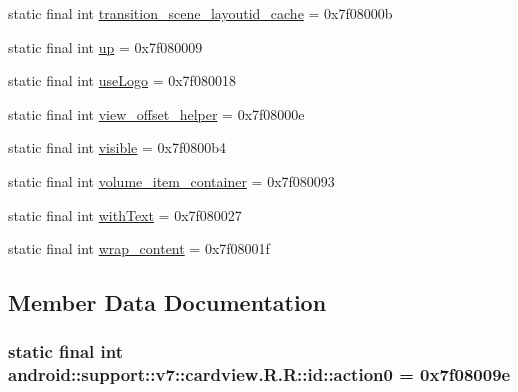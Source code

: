 \begin{CompactItemize}
\item 
static final int \hyperlink{classandroid_1_1support_1_1v7_1_1cardview_1_1_r_1_1id_b3c0e635176d331f4c8ae7cfb6641a57}{transition\_\-scene\_\-layoutid\_\-cache} = 0x7f08000b
\item 
static final int \hyperlink{classandroid_1_1support_1_1v7_1_1cardview_1_1_r_1_1id_917f6a1b444c525fa043e7ec9e165f1e}{up} = 0x7f080009
\item 
static final int \hyperlink{classandroid_1_1support_1_1v7_1_1cardview_1_1_r_1_1id_e59096b6186e3c2f80fc0976494e7a1f}{useLogo} = 0x7f080018
\item 
static final int \hyperlink{classandroid_1_1support_1_1v7_1_1cardview_1_1_r_1_1id_38cafd90d760542298119b5eae35b4fc}{view\_\-offset\_\-helper} = 0x7f08000e
\item 
static final int \hyperlink{classandroid_1_1support_1_1v7_1_1cardview_1_1_r_1_1id_36c2eba910bdc4678e38b93263820e48}{visible} = 0x7f0800b4
\item 
static final int \hyperlink{classandroid_1_1support_1_1v7_1_1cardview_1_1_r_1_1id_ff092ff6f37f9dabcd8c73f9554b3c1c}{volume\_\-item\_\-container} = 0x7f080093
\item 
static final int \hyperlink{classandroid_1_1support_1_1v7_1_1cardview_1_1_r_1_1id_9b2a9bea2e6d7f10c34f29a85fd09bf0}{withText} = 0x7f080027
\item 
static final int \hyperlink{classandroid_1_1support_1_1v7_1_1cardview_1_1_r_1_1id_def8dafb8bcd9d3a42a480136960d87b}{wrap\_\-content} = 0x7f08001f
\end{CompactItemize}


\subsection{Member Data Documentation}
\hypertarget{classandroid_1_1support_1_1v7_1_1cardview_1_1_r_1_1id_ca49f81d19bad006c2e7f014a67dbb6b}{
\subsubsection[{action0}]{\setlength{\rightskip}{0pt plus 5cm}static final int android::support::v7::cardview.R.R::id::action0 = 0x7f08009e}}
\label{classandroid_1_1support_1_1v7_1_1cardview_1_1_r_1_1id_ca49f81d19bad006c2e7f014a67dbb6b}


